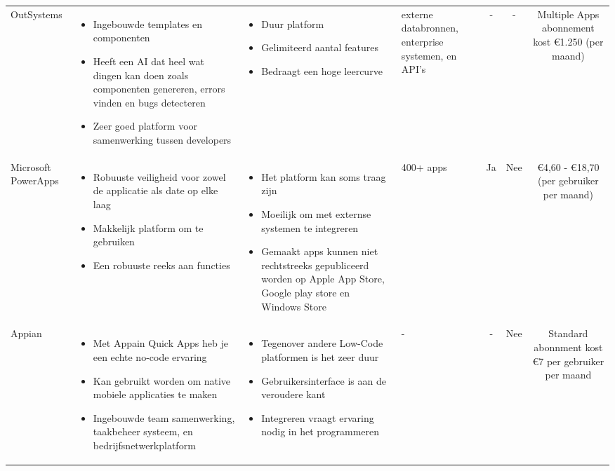 \begin{longtable}{p{2.2cm} p{2.4cm} p{2.4cm} p{2.2cm} c c c}
    OutSystems & 
    \begin{itemize}
        \item Ingebouwde templates en componenten
        \item Heeft een AI dat heel wat dingen kan doen zoals componenten genereren, errors vinden en bugs detecteren 
        \item Zeer goed platform voor samenwerking tussen developers
    \end{itemize} & 
    \begin{itemize}
        \item  Duur platform
        \item  Gelimiteerd aantal features
        \item  Bedraagt een hoge leercurve
    \end{itemize} &
    externe databronnen, enterprise systemen, en API's &
    - &
    - &
    Multiple Apps abonnement kost €1.250 (per maand)\\

    Microsoft PowerApps & 
    \begin{itemize}
        \item Robuuste veiligheid voor zowel de applicatie als date op elke laag
        \item Makkelijk platform om te gebruiken
        \item Een robuuste reeks aan functies
    \end{itemize} & 
    \begin{itemize}
        \item Het platform kan soms traag zijn
        \item Moeilijk om met externse systemen te integreren
        \item Gemaakt apps kunnen niet rechtstreeks gepubliceerd worden op Apple App Store, Google play store en Windows Store
    \end{itemize} &
    400+ apps &
    Ja &
    Nee &
    €4,60 - €18,70 (per gebruiker per maand)\\


    Appian & 
    \begin{itemize}
        \item Met Appain Quick Apps heb je een echte no-code ervaring
        \item Kan gebruikt worden om native mobiele applicaties te maken
        \item Ingebouwde team samenwerking, taakbeheer systeem, en bedrijfsnetwerkplatform
    \end{itemize} & 
    \begin{itemize}
        \item Tegenover andere Low-Code platformen is het zeer duur
        \item Gebruikersinterface is aan de veroudere kant 
        \item Integreren vraagt ervaring nodig in het programmeren
    \end{itemize} &
    - &
    - &
    Nee &
    Standard abonnment kost €7 per gebruiker per maand\\


\end{longtable}
